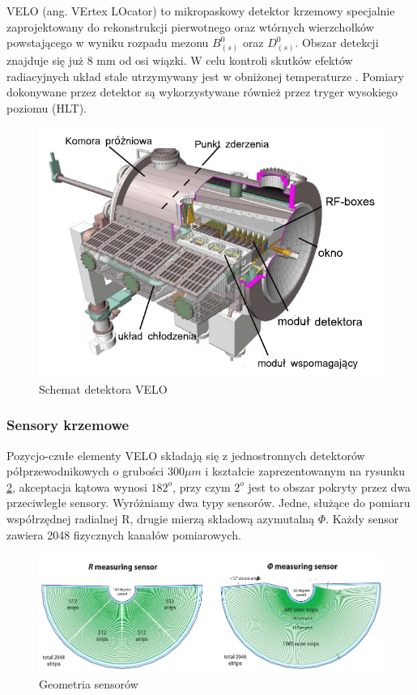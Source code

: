 VELO (ang. VErtex LOcator) to mikropaskowy detektor krzemowy specjalnie zaprojektowany do rekonstrukcji pierwotnego oraz wtórnych wierzchołków powstającego w wyniku rozpadu mezonu $B_{(s)}^0$ oraz $D_{(s)}^0$\cite{VELORaport}. Obszar detekcji znajduje się już 8 mm od osi wiązki. W celu kontroli skutków efektów radiacyjnych układ stale utrzymywany jest w obniżonej temperaturze \cite{Papadelis} . Pomiary dokonywane przez detektor są wykorzystywane również przez tryger wysokiego poziomu (HLT). 
\begin{figure}[!ht]
 \centering
 \includegraphics[scale=0.7]{rozdzial2/Velo_jakis.png}
 \caption{Schemat detektora VELO\cite{VELORaport}}
 \label{fig:SchematVELO}
\end{figure}
\subsubsection{Sensory krzemowe }
Pozycjo-czułe elementy VELO składają się z jednostronnych detektorów półprzewodnikowych o grubości 300$\mu m$ i  kształcie zaprezentowanym na rysunku \ref{fig:sensory}, akceptacja kątowa wynosi $182^{o}$, przy czym $2^{o}$ jest to obszar pokryty przez dwa przeciwległe sensory. Wyróżniamy dwa typy sensorów. Jedne, służące do pomiaru współrzędnej radialnej R, drugie mierzą składową azymutalną $\Phi$. Każdy sensor zawiera 2048 fizycznych kanałów pomiarowych. 
\begin{figure}[ht!]
 \centering
 \includegraphics[scale=0.6]{rozdzial2/sensory.jpeg}
 \caption{Geometria sensorów \cite{VELORaport}}
 \label{fig:sensory}
\end{figure}


